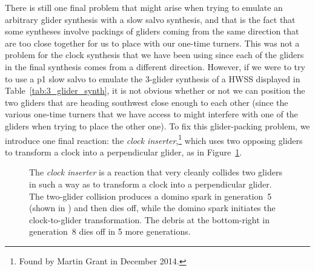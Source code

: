 There is still one final problem that might arise when trying to emulate an arbitrary glider synthesis with a slow salvo synthesis, and that is the fact that some syntheses involve packings of gliders coming from the same direction that are too close together for us to place with our one-time turners. This was not a problem for the clock synthesis that we have been using since each of the gliders in the final synthesis comes from a different direction. However, if we were to try to use a p1 slow salvo to emulate the 3-glider synthesis of a HWSS displayed in Table~\ref{tab:3_glider_synth}, it is not obvious whether or not we can position the two gliders that are heading southwest close enough to each other (since the various one-time turners that we have access to might interfere with one of the gliders when trying to place the other one). To fix this glider-packing problem, we introduce one final reaction: the \emph{clock inserter},\footnote{Found by Martin Grant in December 2014.} which uses two opposing gliders to transform a clock into a perpendicular glider, as in Figure~\ref{fig:clock_inserter}.
\begin{figure}[!ht]
	\centering
	\caption{The \emph{clock inserter} is a reaction that very cleanly collides two gliders in such a way as to transform a clock into a perpendicular glider. The two-glider collision produces a domino spark in generation~5 (shown in ) and then dies off, while the domino spark initiates the clock-to-glider transformation. The debris at the bottom-right in generation~8 dies off in 5 more generations.}\label{fig:clock_inserter}
\end{figure}

